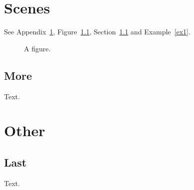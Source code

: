 \documentclass{report}
\newcounter{ex}[chapter]
\begin{document}
\appendix
\chapter{Scenes}\label{scenes}
See Appendix~\ref{scenes}, Figure~\ref{fig}, Section~\ref{more} and Example~\ref{ex1}.
\label{ex1}
\begin{figure}[h]\centering\caption{A figure.}\label{fig}\end{figure}
\section{More}\label{more}
Text.
\chapter{Other}
\section{Last}
Text.
\end{document}
